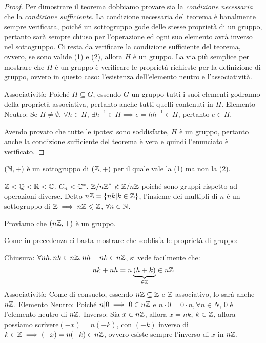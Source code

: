 \documentclass[11pt]{scrartcl}
\begin{document}
\begin{proof}
Per dimostrare il teorema dobbiamo provare sia la \emph{condizione necessaria} che la \emph{condizione sufficiente}. La condizione necessaria del teorema è banalmente sempre verificata, poiché un sottogruppo gode delle stesse proprietà di un gruppo, pertanto sarà sempre chiuso per l'operazione ed ogni suo elemento avrà inverso nel sottogruppo. Ci resta da verificare la condizione sufficiente del teorema, ovvero, se sono valide (1) e (2), allora $H$ è un gruppo. La via più semplice per mostrare che $H$ è un gruppo è verificare le proprietà richieste per la definizione di gruppo, ovvero in questo caso: l'esistenza dell'elemento neutro e l'associatività.
	\begin{enumerate}[(a)]
		\ii Associatività: Poiché $H \subseteq G$, essendo $G$ un gruppo tutti i suoi elementi godranno della proprietà associativa, pertanto anche tutti quelli contenuti in $H$.
		\ii Elemento Neutro: Se $H \neq \emptyset$, $\forall h\in H$, $\exists h^{-1} \in H \implies e=hh^{-1} \in H$, pertanto $e \in H$. 
	\end{enumerate}
Avendo provato che tutte le ipotesi sono soddisfatte, $H$ è un gruppo, pertanto anche la condizione sufficiente del teorema è vera e quindi l'enunciato è verificato. 
\end{proof}

\begin{remark}
[$\NN$ e $\ZZ$]
$(\mathbb N, +)$ è un sottogruppo di $(\mathbb Z, +)$ per il quale vale la (1) ma non la (2).
\end{remark}

\begin{example}
[Sottogruppi]
\listhack
	\begin{itemize}
		\ii $\mathbb Z < \mathbb Q < \mathbb R < \mathbb C$.
		\ii $C_{n} < \mathbb C^*$.
		\ii ${{\mathbb Z}/n{\mathbb Z}}^{*} \nless {\mathbb Z}/n{\mathbb Z}$ poiché sono gruppi rispetto ad operazioni diverse.
		\ii Detto $n\mathbb Z=\left\{nk | k \in \mathbb Z\right\}$, l'insieme dei multipli di $n$ è un sottogruppo di $\mathbb Z \implies n\mathbb Z \leqslant \mathbb Z$, $\forall n \in \mathbb N$.
	\end{itemize}
\end{example}
Proviamo che $(n\mathbb Z, +)$ è un gruppo.

\begin{soln}
Come in precedenza ci basta mostrare che soddisfa le proprietà di gruppo:
	\begin{enumerate}[(a)]
			\ii Chiusura: $\forall nh,nk \in n\mathbb Z, nh+nk \in n\mathbb Z$, si vede facilmente che:
			 	\[nk+nh=n\underbrace{(h+k)}_{\in \mathbb Z} \in n\mathbb Z
			 	\]
			\ii Associatività: Come di consueto, essendo $n\mathbb Z \subseteq \mathbb Z$ e $\ZZ$ associativo, lo sarà anche $n\mathbb Z$.
			\ii Elemento Neutro: Poiché $n|0 \implies 0 \in n\mathbb Z$ e $n \cdot 0 = 0 \cdot n, \forall n \in N$, $0$ è l'elemento neutro di $n\mathbb Z$.
			\ii Inverso: Sia $x\in n\mathbb Z$, allora $x=nk$, $k \in \mathbb Z$, allora possiamo scrivere$(-x)=n(-k)$, con $(-k)$ inverso di $k \in \mathbb Z \implies (-x)=n(-k) \in n\mathbb Z$, ovvero esiste sempre l'inverso di $x$ in $n\mathbb Z$.
	\end{enumerate}
\end{soln}
\end{document}
